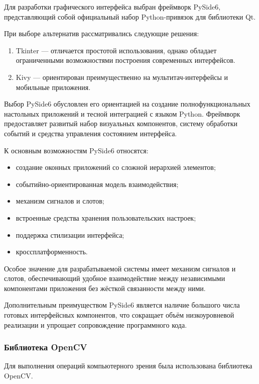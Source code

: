 Для разработки графического интерфейса выбран фреймворк PySide6, представляющий собой официальный набор Python-привязок для библиотеки Qt.

При выборе альтернатив рассматривались следующие решения:

\begin{enumerate}
	\item Tkinter --- отличается простотой использования, однако обладает ограниченными возможностями построения современных интерфейсов.
	\item Kivy --- ориентирован преимущественно на мультитач-интерфейсы и мобильные приложения.
\end{enumerate}

Выбор PySide6 обусловлен его ориентацией на создание полнофункциональных настольных приложений и тесной интеграцией с языком Python. Фреймворк предоставляет развитый набор визуальных компонентов, систему обработки событий и средства управления состоянием интерфейса.

К основным возможностям PySide6 относятся:

\begin{itemize}
	\item создание оконных приложений со сложной иерархией элементов;
	\item событийно-ориентированная модель взаимодействия;
	\item механизм сигналов и слотов;
	\item встроенные средства хранения пользовательских настроек;
	\item поддержка стилизации интерфейса;
	\item кроссплатформенность.
\end{itemize}

Особое значение для разрабатываемой системы имеет механизм сигналов и слотов, обеспечивающий удобное взаимодействие между независимыми компонентами приложения без жёсткой связанности между ними.

Дополнительным преимуществом PySide6 является наличие большого числа готовых интерфейсных компонентов, что сокращает объём низкоуровневой реализации и упрощает сопровождение программного кода.

\subsubsection{Библиотека OpenCV}

Для выполнения операций компьютерного зрения была использована библиотека OpenCV.


